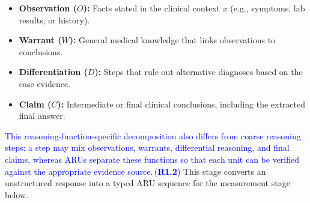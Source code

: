 \documentclass[a4paper,fleqn,doubleblind]{cas-sc}
\DeclareRobustCommand{\added}[1]{\textcolor{blue}{#1}}
\DeclareRobustCommand{\revtag}[1]{\textcolor{blue}{\scriptsize\,(\textbf{#1})}}
\begin{document}
\begin{itemize}
    \item \textbf{Observation ($O$):} Facts stated in the clinical context $x$ (e.g., symptoms, lab results, or history).
    \item \textbf{Warrant ($W$):} General medical knowledge that links observations to conclusions.
    \item \textbf{Differentiation ($D$):} Steps that rule out alternative diagnoses based on the case evidence.
    \item \textbf{Claim ($C$):} Intermediate or final clinical conclusions, including the extracted final answer.
\end{itemize}

\added{This reasoning-function-specific decomposition also differs from coarse reasoning steps: a step may mix observations, warrants, differential reasoning, and final claims, whereas ARUs separate these functions so that each unit can be verified against the appropriate evidence source.}\revtag{R1.2}
This stage converts an unstructured response into a typed ARU sequence for the measurement stage below.
\end{document}
